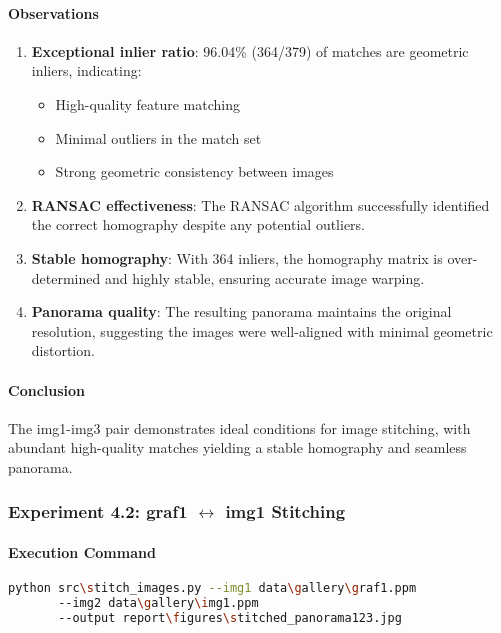 \documentclass[12pt,a4paper]{article}
\begin{document}
\paragraph{Observations}
\begin{enumerate}
    \item \textbf{Exceptional inlier ratio}: 96.04\% (364/379) of matches are geometric inliers, indicating:
    \begin{itemize}
        \item High-quality feature matching
        \item Minimal outliers in the match set
        \item Strong geometric consistency between images
    \end{itemize}
    
    \item \textbf{RANSAC effectiveness}: The RANSAC algorithm successfully identified the correct homography despite any potential outliers.
    
    \item \textbf{Stable homography}: With 364 inliers, the homography matrix is over-determined and highly stable, ensuring accurate image warping.
    
    \item \textbf{Panorama quality}: The resulting panorama maintains the original resolution, suggesting the images were well-aligned with minimal geometric distortion.
\end{enumerate}

\paragraph{Conclusion}
The img1-img3 pair demonstrates ideal conditions for image stitching, with abundant high-quality matches yielding a stable homography and seamless panorama.

\subsubsection{Experiment 4.2: graf1 $\leftrightarrow$ img1 Stitching}

\paragraph{Execution Command}
\begin{lstlisting}[language=bash]
python src\stitch_images.py --img1 data\gallery\graf1.ppm 
       --img2 data\gallery\img1.ppm 
       --output report\figures\stitched_panorama123.jpg
\end{lstlisting}
\end{document}
